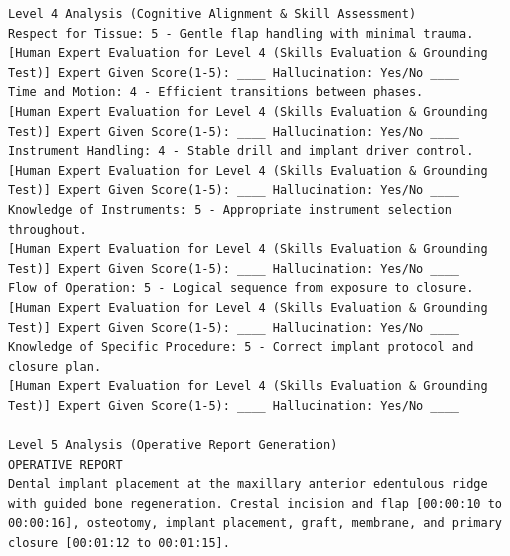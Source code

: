 \documentclass[11pt,a4paper]{article}
\begin{document}
\begin{lstlisting}[style=aiout]
Level 4 Analysis (Cognitive Alignment & Skill Assessment)
Respect for Tissue: 5 - Gentle flap handling with minimal trauma.
[Human Expert Evaluation for Level 4 (Skills Evaluation & Grounding Test)] Expert Given Score(1-5): ____ Hallucination: Yes/No ____
Time and Motion: 4 - Efficient transitions between phases.
[Human Expert Evaluation for Level 4 (Skills Evaluation & Grounding Test)] Expert Given Score(1-5): ____ Hallucination: Yes/No ____
Instrument Handling: 4 - Stable drill and implant driver control.
[Human Expert Evaluation for Level 4 (Skills Evaluation & Grounding Test)] Expert Given Score(1-5): ____ Hallucination: Yes/No ____
Knowledge of Instruments: 5 - Appropriate instrument selection throughout.
[Human Expert Evaluation for Level 4 (Skills Evaluation & Grounding Test)] Expert Given Score(1-5): ____ Hallucination: Yes/No ____
Flow of Operation: 5 - Logical sequence from exposure to closure.
[Human Expert Evaluation for Level 4 (Skills Evaluation & Grounding Test)] Expert Given Score(1-5): ____ Hallucination: Yes/No ____
Knowledge of Specific Procedure: 5 - Correct implant protocol and closure plan.
[Human Expert Evaluation for Level 4 (Skills Evaluation & Grounding Test)] Expert Given Score(1-5): ____ Hallucination: Yes/No ____

Level 5 Analysis (Operative Report Generation)
OPERATIVE REPORT
Dental implant placement at the maxillary anterior edentulous ridge with guided bone regeneration. Crestal incision and flap [00:00:10 to 00:00:16], osteotomy, implant placement, graft, membrane, and primary closure [00:01:12 to 00:01:15].
\end{lstlisting}
\end{document}
